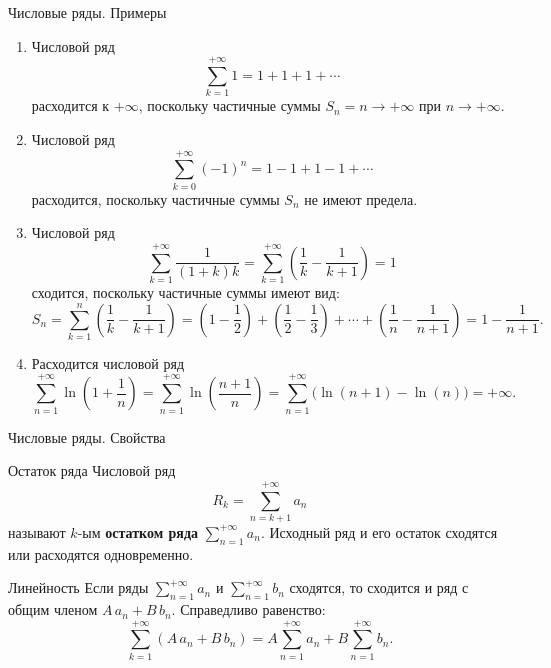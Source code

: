 \documentclass[8pt]{beamer}
\begin{document}

\begin{frame}{Числовые ряды. Примеры}
\begin{enumerate}
\item Числовой ряд
$$\sum_{k=1}^{+\infty}1 = 1+1+1+\cdots$$
расходится к $+\infty$, поскольку частичные суммы $S_n = n\to+\infty$ при $n\to+\infty$.
\item Числовой ряд
$$\sum_{k=0}^{+\infty}(-1)^n = 1-1+1-1+\cdots$$
расходится, поскольку частичные суммы $S_n$ не имеют предела.
\item Числовой ряд
$$\sum_{k=1}^{+\infty}\frac{1}{(1+k)k} =
 \sum_{k=1}^{+\infty} \left(\frac{1}{k}-\frac{1}{k+1}\right) =1$$
сходится, поскольку частичные суммы имеют вид:
$$S_n = \sum_{k=1}^n \left(\frac{1}{k}-\frac{1}{k+1}\right) =
 \left(1-\frac{1}{2}\right)+\left(\frac12 - \frac13\right)+\cdots+ \left( \frac{1}{n} - \frac{1}{n+1}\right) = 1-\frac{1}{n+1}.$$
 \item Расходится числовой ряд
 $$\sum_{n=1}^{+\infty}\ln\left( 1 + \frac{1}{n} \right) = \sum_{n=1}^{+\infty}\ln\left( \frac{n+1}{n} \right) = 
\sum_{n=1}^{+\infty}\Big( \ln(n+1) - \ln(n) \Big) = +\infty.$$
\end{enumerate}
\end{frame}


\begin{frame}{Числовые ряды. Свойства}
\begin{block}{Остаток ряда}
Числовой ряд
$$R_k=\sum_{n=k+1}^{+\infty} a_n$$
называют $k$-ым {\bf остатком ряда} $\displaystyle \sum_{n=1}^{+\infty}a_n$. Исходный ряд и его остаток сходятся или расходятся одновременно.
\end{block}

\begin{block}{Линейность}
Если ряды $\displaystyle \sum_{n=1}^{+\infty}a_n$ и $\displaystyle \sum_{n=1}^{+\infty}b_n$ сходятся, то сходится и ряд с общим членом $A\, a_n+B\, b_n$. Справедливо равенство:
$$\sum_{k=1}^{+\infty} \left( A\, a_n+B\, b_n \right) = A\sum_{n=1}^{+\infty}a_n+B\sum_{n=1}^{+\infty}b_n.$$
\end{block}
\end{frame}
\end{document}
